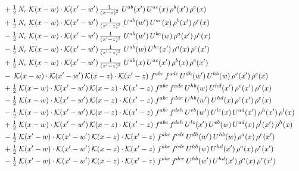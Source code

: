 \documentclass[10pt]{article}
\numberwithin{equation}{section}
\begin{document}
\begin{align}
&\quad +\tfrac{1}{2}\,N_c\;\mathcal{K}(x-w)\cdot\mathcal{K}(x'-w')\,\tfrac{1}{(x-z)^{2}}\;U^{ab}(x')\,U^{ac}(x)\,\rho^{b}(x')\,\rho^{c}(x)\notag\\
&\quad +\tfrac{1}{2}\,N_c\;\mathcal{K}(x-w)\cdot\mathcal{K}(x'-w')\,\tfrac{1}{(x'-z)^{2}}\;U^{ab}(w')\,U^{ac}(x)\,\rho^{b}(x')\,\rho^{c}(x)\notag\\
&\quad -\tfrac{1}{2}\,N_c\;\mathcal{K}(x-w)\cdot\mathcal{K}(x'-w')\,\tfrac{1}{(x'-z)^{2}}\;U^{ab}(w')\,U^{bc}(w)\,\rho^{a}(x')\,\rho^{c}(x)\notag\\
&\quad -\tfrac{1}{2}\,N_c\;\mathcal{K}(x-w)\cdot\mathcal{K}(x'-w')\,\tfrac{1}{(x'-z)^{2}}\;U^{ab}(w)\,U^{bc}(x')\,\rho^{a}(x)\,\rho^{c}(x')\notag\\
&\quad +\tfrac{1}{2}\,N_c\;\mathcal{K}(x-w)\cdot\mathcal{K}(x'-w')\,\tfrac{1}{(x'-z)^{2}}\;U^{ab}(x)\,U^{ac}(x')\,\rho^{b}(x)\,\rho^{c}(x')\notag\\
&\quad -\;\mathcal{K}(x-w)\cdot\mathcal{K}(x'-w')\,\mathcal{K}(x-z)\cdot\mathcal{K}(x'-z)\;f^{abc}\,f^{ade}\,U^{dh}(w')\,U^{hb}(w)\,\rho^{e}(x')\,\rho^{c}(x)\notag\\
&\quad +\tfrac{1}{2}\;\mathcal{K}(x-w)\cdot\mathcal{K}(x'-w')\,\mathcal{K}(x-z)\cdot\mathcal{K}(x'-z)\;f^{abc}\,f^{ade}\,U^{hb}(w)\,U^{hd}(x')\,\rho^{e}(x')\,\rho^{c}(x)\notag\\
&\quad -\tfrac{1}{2}\;\mathcal{K}(x-w)\cdot\mathcal{K}(x'-w')\,\mathcal{K}(x-z)\cdot\mathcal{K}(x'-z)\;f^{abc}\,f^{dae}\,U^{hb}(w')\,U^{hd}(x)\,\rho^{c}(x')\,\rho^{e}(x)\notag\\
&\quad -\tfrac{1}{2}\;\mathcal{K}(x-w)\cdot\mathcal{K}(x'-w')\,\mathcal{K}(x-z)\cdot\mathcal{K}(x'-z)\;f^{abc}\,f^{deh}\,U^{eb}(w')\,U^{lc}(x)\,U^{ad}(x')\,\rho^{h}(x')\,\rho^{l}(x)\notag\\
&\quad +\tfrac{1}{2}\;\mathcal{K}(x-w)\cdot\mathcal{K}(x'-w')\,\mathcal{K}(x-z)\cdot\mathcal{K}(x'-z)\;f^{abc}\,f^{deh}\,U^{lc}(x')\,U^{eb}(w)\,U^{ad}(x)\,\rho^{l}(x')\,\rho^{h}(x)\notag\\
&\quad -\tfrac{1}{2}\;\mathcal{K}(x'-w)\cdot\mathcal{K}(x'-w')\,\mathcal{K}(x-z)\cdot\mathcal{K}(x'-z)\;f^{abc}\,f^{cde}\,U^{dh}(w')\,U^{hb}(w)\,\rho^{a}(x)\,\rho^{e}(x')\notag\\
&\quad +\tfrac{1}{2}\;\mathcal{K}(x'-w)\cdot\mathcal{K}(x'-w')\,\mathcal{K}(x-z)\cdot\mathcal{K}(x'-z)\;f^{abc}\,f^{cde}\,U^{hb}(w)\,U^{hd}(x')\,\rho^{a}(x)\,\rho^{e}(x')\notag\\
&\quad -\tfrac{1}{2}\;\mathcal{K}(x'-w)\cdot\mathcal{K}(x'-w')\,\mathcal{K}(x-z)\cdot\mathcal{K}(x'-z)\;f^{abc}\,f^{dce}\,U^{hb}(w')\,U^{hd}(x')\,\rho^{a}(x)\,\rho^{e}(x')\notag\\

\end{align}
\end{document}
